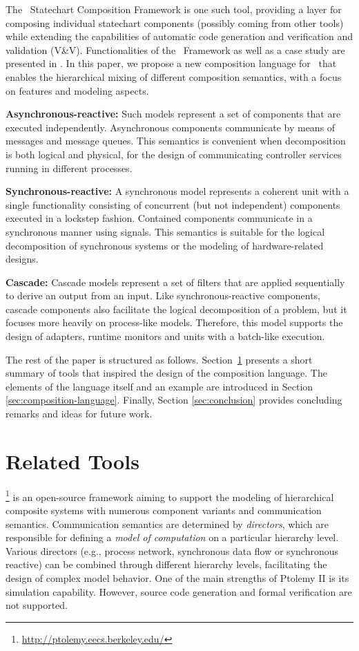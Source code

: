 The \gamma\ Statechart Composition Framework is one such tool, providing a layer for composing individual statechart components (possibly coming from other tools) while extending the capabilities of automatic code generation and verification and validation (V\&V). Functionalities of the \gamma\ Framework as well as a case study are presented in \cite{graics-bence-bsc}. In this paper, we propose a new composition language for \gamma\ that enables the hierarchical mixing of different composition semantics, with a focus on features and modeling aspects.

\textbf{Asynchronous-reactive:} Such models represent a set of components that are executed independently. Asynchronous components communicate by means of messages and message queues. This semantics is convenient when decomposition is both logical and physical, \eg for the design of communicating controller services running in different processes.
	
\textbf{Synchronous-reactive:} A synchronous model represents a coherent unit with a single functionality consisting of concurrent (but not independent) components executed in a lockstep fashion. Contained components communicate in a synchronous manner using signals. This semantics is suitable for the logical decomposition of synchronous systems or the modeling of hardware-related designs.
	
\textbf{Cascade:} Cascade models represent a set of filters that are applied sequentially to derive an output from an input. Like synchronous-reactive components, cascade components also facilitate the logical decomposition of a problem, but it focuses more heavily on process-like models. Therefore, this model supports the design of adapters, runtime monitors and units with a batch-like execution.

The rest of the paper is structured as follows. Section~\ref{sec:related-tools} presents a short summary of tools that inspired the design of the composition language. The elements of the language itself and an example are introduced in Section \ref{sec:composition-language}. Finally, Section \ref{sec:conclusion} provides concluding remarks and ideas for future work.

\section{Related Tools}
\label{sec:related-tools}

\ptolemy\footnote{\url{http://ptolemy.eecs.berkeley.edu/}} \cite{ptolemy,ptolemy2} is an open-source framework aiming to support
the modeling of hierarchical composite systems with numerous component variants and communication semantics. Communication semantics are determined by \emph{directors}, which are responsible for defining a \emph{model of computation} on a particular hierarchy level. Various directors (e.g., process network, synchronous data flow
or synchronous reactive) can be combined through different hierarchy levels, facilitating the design of complex model behavior. One of the main strengths of Ptolemy II is its simulation capability. However, source code generation and formal verification are not supported.

